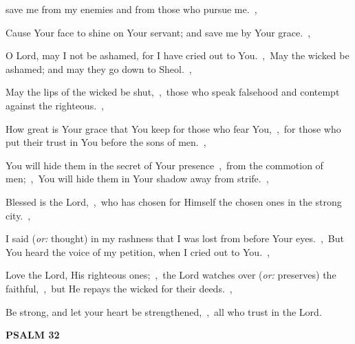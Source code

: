 \documentclass[12pt,twoside,a5paper]{article}
\newcommand{\psalm}[1]{\textbf{PSALM {#1}}\nopagebreak}
\newcommand{\translationoption}[1]{\emph{or:} #1}
\begin{document}
\begin{normalparskip}
  save me from my enemies and from those who pursue me.~\sep

  Cause Your face to shine on Your servant; and save me by Your grace.~\sep

  O Lord, may I not be ashamed, for I have cried out to You.~\sep\ May the wicked be ashamed; and may they go down to Sheol.~\sep

  May the lips of the wicked be shut,~\sep\ those who speak falsehood and contempt against the righteous.~\sep

  How great is Your grace that You keep for those who fear You,~\sep\ for those who put their trust in You before the sons of men.~\sep

  You will hide them in the secret of Your presence~\sep\ from the commotion of men;~\sep\ You will hide them in Your shadow away from strife.~\sep

  Blessed is the Lord,~\sep\ who has chosen for Himself the chosen ones in the strong city.~\sep

  I said (\translationoption{thought}) in my rashness that I was lost from before Your eyes.~\sep\ But You heard the voice of my petition, when I cried out to You.~\sep

  Love the Lord, His righteous ones;~\sep\ the Lord watches over (\translationoption{preserves}) the faithful,~\sep\ but He repays the wicked for their deeds.~\sep

  Be strong, and let your heart be strengthened,~\sep\ all who trust in the Lord.
\end{normalparskip}

\psalm{32}
\end{document}
